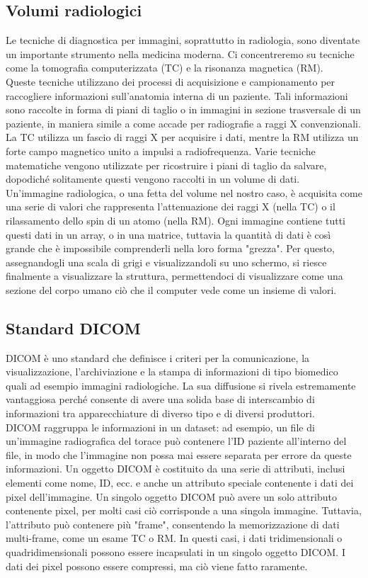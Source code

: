 \subsection{Volumi radiologici}\label{sec:volumi-radiologici}
Le tecniche di diagnostica per immagini, soprattutto in radiologia, sono diventate un importante strumento nella medicina moderna. Ci concentreremo su tecniche come la tomografia computerizzata (TC) e la risonanza magnetica (RM).
\\
Queste tecniche utilizzano dei processi di acquisizione e campionamento per raccogliere informazioni sull'anatomia interna di un paziente. Tali informazioni sono raccolte in forma di piani di taglio o in immagini in sezione trasversale di un paziente, in maniera simile a come accade per radiografie a raggi X convenzionali. La TC utilizza un fascio di raggi X per acquisire i dati, mentre la RM utilizza un forte campo magnetico unito a  impulsi a radiofrequenza. Varie tecniche matematiche vengono utilizzate per ricostruire i piani di taglio da salvare, dopodiché solitamente questi vengono raccolti in un volume di dati.
\\
Un'immagine radiologica, o una fetta del volume nel nostro caso, è acquisita come una serie di valori che rappresenta l'attenuazione dei raggi X (nella TC) o il rilassamento dello spin di un atomo (nella RM). Ogni immagine contiene tutti questi dati in un array, o in una matrice, tuttavia la quantità di dati è così grande che è impossibile comprenderli nella loro forma "grezza". Per questo, assegnandogli una scala di grigi e visualizzandoli su uno schermo, si riesce finalmente a visualizzare la struttura, permettendoci di visualizzare come una sezione del corpo umano ciò che il computer vede come un insieme di valori.

\subsection{Standard DICOM}
DICOM è uno standard che definisce i criteri per la comunicazione, la visualizzazione, l'archiviazione e la stampa di informazioni di tipo biomedico quali ad esempio immagini radiologiche. La sua diffusione si rivela estremamente vantaggiosa perché consente di avere una solida base di interscambio di informazioni tra apparecchiature di diverso tipo e di diversi produttori.
\\
DICOM raggruppa le informazioni in un dataset: ad esempio, un file di un'immagine radiografica del torace può contenere l'ID paziente all'interno del file, in modo che l'immagine non possa mai essere separata per errore da queste informazioni. Un oggetto DICOM è costituito da una serie di attributi, inclusi elementi come nome, ID, ecc. e anche un attributo speciale contenente i dati dei pixel dell'immagine. Un singolo oggetto DICOM può avere un solo attributo contenente pixel, per molti casi ciò corrisponde a una singola immagine. Tuttavia, l'attributo può contenere più "frame", consentendo la memorizzazione di dati multi-frame, come un esame TC o RM. In questi casi, i dati tridimensionali o quadridimensionali possono essere incapsulati in un singolo oggetto DICOM. I dati dei pixel possono essere compressi, ma ciò viene fatto raramente.

